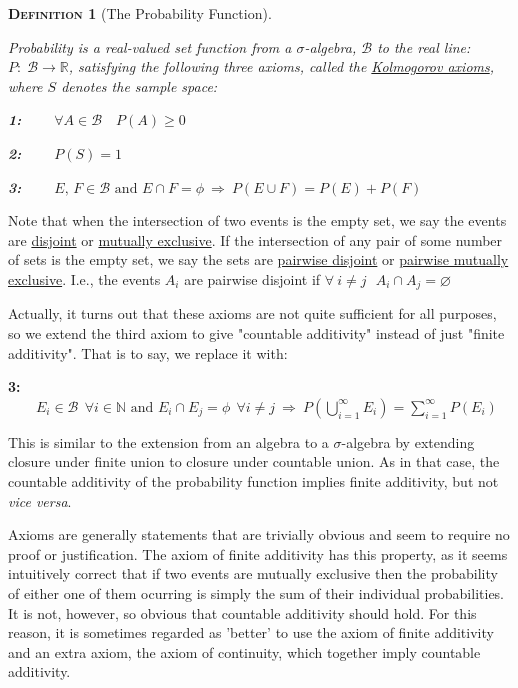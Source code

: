 \documentclass[12pt,a4paper]{article}
\newtheorem{definition}{\textsc{Definition}}[section]
\begin{document}
\begin{definition}[The Probability Function]$\;$\par
\vspace{12pt}

Probability is a real-valued set function from a $\sigma$-algebra, $\mathcal{B}$ to the real line: $P:\;\mathcal{B}\rightarrow\mathbb{R}$, satisfying the following three axioms, called the \underline{Kolmogorov axioms}, where $S$ denotes the sample space:\par
\vspace{1pt}
{\bf 1:} $\qquad\forall A\in\mathcal{B}\quad P(A)\geq 0$\par
\vspace{10pt}
{\bf 2:} $\qquad P(S)=1$\par
\vspace{10pt}
{\bf 3:} $\qquad E,\, F\in\mathcal{B}\text{ and }E\cap F=\phi\:\Rightarrow\: P(E\cup F)=P(E)+P(F)$
\end{definition}

Note that when the intersection of two events is the empty set, we say the events are \underline{disjoint} or \underline{mutually exclusive}. If the intersection of any pair of some number of sets is the empty set, we say the sets are \underline{pairwise disjoint} or \underline{pairwise mutually exclusive}. I.e., the events $A_i$ are pairwise disjoint if $\forall \:i\neq j \:\:\:A_i\cap A_j = \varnothing$

Actually, it turns out that these axioms are not quite sufficient for all purposes, so we extend the third axiom to give "countable additivity" instead of just "finite additivity". That is to say, we replace it with:\par
\vspace{10pt}
{\bf 3:} $\qquad E_i\in\mathcal{B}\:\:\forall i\in\mathbb{N}\text{ and }E_i\cap E_j=\phi\:\:\forall i\neq j\:\Rightarrow\:P(\bigcup_{i=1}^{\infty}E_i)=\sum_{i=1}^{\infty}P(E_i)$\par
\vspace{10pt}

This is similar to the extension from an algebra to a $\sigma$-algebra by extending closure under finite union to closure under countable union. As in that case, the countable additivity of the probability function implies finite additivity, but not {\it vice versa}.

Axioms are generally statements that are trivially obvious and seem to require no proof or justification. The axiom of finite additivity has this property, as it seems intuitively correct that if two events are mutually exclusive then the probability of either one of them ocurring is simply the sum of their individual probabilities. It is not, however, so obvious that countable additivity should hold. For this reason, it is sometimes regarded as 'better' to use the axiom of finite additivity and an extra axiom, the axiom of continuity, which together imply countable additivity.\par
\vspace{12pt}
\end{document}
